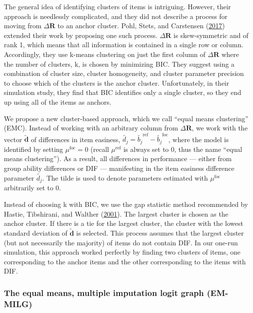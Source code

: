 \documentclass[
  11pt,
]{article}
\begin{document}
The general idea of identifying clusters of items is intriguing. However, their approach is needlessly complicated, and they did not describe a process for moving from \(\Delta \mathbf{R}\) to an anchor cluster. Pohl, Stets, and Carstensen (\protect\hyperlink{ref-pohl2017cluster}{2017}) extended their work by proposing one such process. \(\Delta \mathbf{R}\) is skew-symmetric and of rank 1, which means that all information is contained in a single row or column. Accordingly, they use k-means clustering on just the first column of \(\Delta \mathbf{R}\) where the number of clusters, k, is chosen by minimizing BIC. They suggest using a combination of cluster size, cluster homogeneity, and cluster parameter precision to choose which of the clusters is the anchor cluster. Unfortunately, in their simulation study, they find that BIC identifies only a single cluster, so they end up using all of the items as anchors.

We propose a new cluster-based approach, which we call \enquote{equal means clustering} (EMC). Instead of working with an arbitrary column from \(\Delta \mathbf{R}\), we work with the vector \(\tilde{\mathbf{d}}\) of differences in item easiness, \(\tilde{d_j} = \tilde{b_j}^\text{ref} - \tilde{b_j}^\text{foc}\), where the model is identified by setting \(\mu^\text{foc} = 0\) (recall \(\mu^\text{ref}\) is always set to \(0\), thus the name \enquote{equal means clustering}). As a result, all differences in performance --- either from group ability differences or DIF --- manifesting in the item easiness difference parameter \(\tilde{d_j}\). The tilde is used to denote parameters estimated with \(\mu^\text{foc}\) arbitrarily set to \(0\).

Instead of choosing k with BIC, we use the gap statistic method recommended by Hastie, Tibshirani, and Walther (\protect\hyperlink{ref-hastie2001estimating}{2001}). The largest cluster is chosen as the anchor cluster. If there is a tie for the largest cluster, the cluster with the lowest standard deviation of \(\tilde{\mathbf{d}}\) is selected. This process assumes that the largest cluster (but not necessarily the majority) of items do not contain DIF. In our one-run simulation, this approach worked perfectly by finding two clusters of items, one corresponding to the anchor items and the other corresponding to the items with DIF.

\hypertarget{the-equal-means-multiple-imputation-logit-graph-em-milg}{%
\subsubsection{The equal means, multiple imputation logit graph (EM-MILG)}\label{the-equal-means-multiple-imputation-logit-graph-em-milg}}
\end{document}

